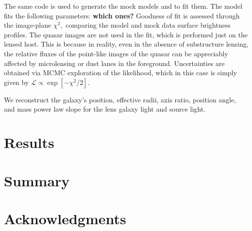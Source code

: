 \documentclass[a4paper,11pt]{article}
\begin{document}
The same code is used to generate the mock models and to fit them. The model fits the following parameters: \textbf{which ones?}  Goodness of fit is assessed through the image-plane $\chi^{2},$ comparing the model and mock data surface brightness profiles. The quasar images are not used in the fit, which is performed just on the lensed host. This is because in reality, even in the absence of substructure lensing, the relative fluxes of the point-like images of the quasar can be appreciably affected by microlensing or dust lanes in the foreground. Uncertainties are obtained via MCMC exploration of the likelihood, which in this case is simply given by $\mathcal{L}\propto\exp[-\chi^{2}/2].$

We reconstruct the galaxy's position, effective radii, axis ratio, position angle, and mass power law slope for the lens galaxy light and source light. 

\section{Results}

\section{Summary}

\section*{Acknowledgments}









\end{document}
